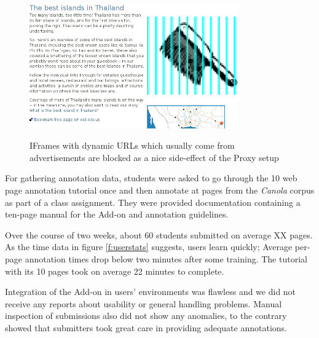 \begin{figure}
	{\includegraphics[width=0.8\textwidth]{add}}
\caption{\label{f:iframes}IFrames with dynamic URLs which usually come from advertisements are blocked as a nice side-effect of the Proxy setup}
\end{figure}

For gathering annotation data, students were asked to go through the 10 web page annotation tutorial once and then annotate at pages from the \textit{Canola} corpus as part of a class assignment.
They were provided documentation containing a ten-page manual for the Add-on and annotation guidelines.

Over the course of two weeks, about 60 students submitted on average XX pages.
As the time data in figure \ref{f:userstats} suggests, users learn quickly; 
Average per-page annotation times drop below two minutes after some training.
The tutorial with its 10 pages took on average 22 minutes to complete.

Integration of the Add-on in users' environments was flawless and we did not receive any reports about usability or general handling problems.
Manual inspection of submissions also did not show any anomalies, to the contrary showed that submitters took great care in providing adequate annotations.

